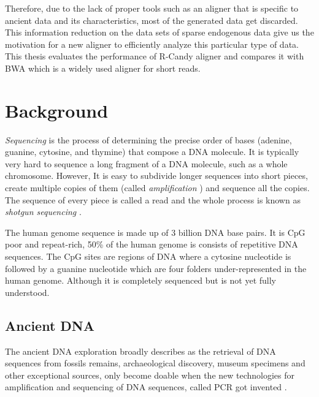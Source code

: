 \documentclass[11pt,a4paper]{report}
\begin{document}
Therefore, due to the lack of proper tools such as an aligner that is 
specific to ancient data and its characteristics, most of the generated 
data get discarded. 
This information reduction on the data sets of sparse endogenous data give 
us the motivation for a new aligner to efficiently analyze this particular
type of data.
\\
This thesis evaluates the performance of R-Candy aligner and compares it 
with BWA which is a widely used aligner for short reads.






\clearpage
\section{Background } \label{Background }


\emph{Sequencing} is the process of determining the precise order of bases 
(adenine, guanine, cytosine, and thymine) that compose a DNA molecule. 
It is typically very hard to sequence a long fragment of a DNA molecule, 
such as a whole chromosome. However, It is easy to subdivide longer sequences
into short pieces, create multiple copies of them (called \emph{amplification} ) 
and sequence all the copies. The sequence of every piece is called a read and 
the whole process is known as \emph{shotgun sequencing} \cite{algorithmDesign}.


The human genome sequence is made up of 3 billion DNA base pairs.
It is CpG poor and repeat-rich, 50\% of the human genome is consists 
of repetitive DNA sequences. The CpG sites are regions of DNA where 
a cytosine nucleotide is followed by a guanine nucleotide which are 
four folders under-represented in the human genome. 
Although it is completely sequenced but is not yet fully understood. 




\subsection{Ancient DNA } \label{Ancient DNA }
The ancient DNA exploration broadly describes as the retrieval of DNA sequences 
from fossils remains, archaeological discovery, museum specimens and other 
exceptional sources, only become doable when the new technologies for amplification
and sequencing of DNA sequences, called PCR got invented \cite{paabo2004genetic}.
\end{document}
